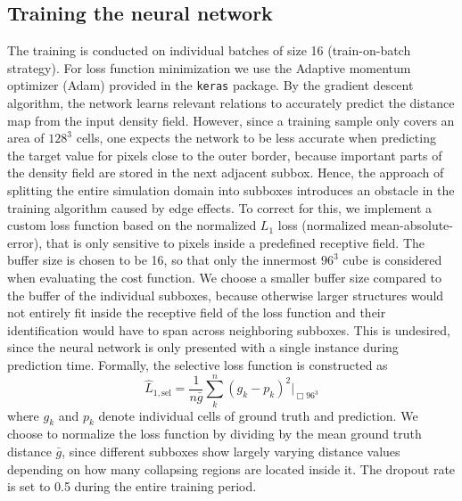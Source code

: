 \documentclass[fleqn,usenatbib]{mnras}
\begin{document}
\subsection{Training the neural network}
\label{sec:training}
The training is conducted on individual batches of size 16 (train-on-batch strategy). For loss function minimization we use the Adaptive momentum optimizer (Adam) provided in the \texttt{keras} \citep{Chollet2015} package. By the gradient descent algorithm, the network learns relevant relations to accurately predict the distance map from the input density field. However, since a training sample only covers an area of $128^{3}$ cells, one expects the network to be less accurate when predicting the target value for pixels close to the outer border, because important parts of the density field are stored in the next adjacent subbox. Hence, the approach of splitting the entire simulation domain into subboxes introduces an obstacle in the training algorithm caused by edge effects. To correct for this, we implement a custom loss function based on the normalized $L_{1}$ loss (normalized mean-absolute-error), that is only sensitive to pixels inside a predefined receptive field. The buffer size is chosen to be 16, so that only the innermost $96^{3}$ cube is considered when evaluating the cost function. We choose a smaller buffer size compared to the buffer of the individual subboxes, because otherwise larger structures would not entirely fit inside the receptive field of the loss function and their identification would have to span across neighboring subboxes. This is undesired, since the neural network is only presented with a single instance during prediction time. Formally, the selective loss function is constructed as
\begin{equation}
    \hat{L}_{1,\text{sel}} = \frac{1}{n\bar{g}} \sum_{k}^{n}(g_{k}-p_{k})^{2} \Big|_{\Box 96^{3}} 
\end{equation}
where $g_{k}$ and $p_{k}$ denote individual cells of ground truth and prediction. We choose to normalize the loss function by dividing by the mean ground truth distance $\bar{g}$, since different subboxes show largely varying distance values depending on how many collapsing regions are located inside it. The dropout rate is set to 0.5 during the entire training period.\\
\end{document}
